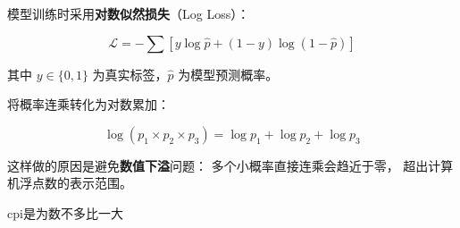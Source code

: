 \begin{note}[对数似然与数值稳定性]

模型训练时采用\textbf{对数似然损失}（Log Loss）：

$$\mathcal{L} = -\sum \left[ y \log \hat{p} 
+ (1-y)\log(1-\hat{p}) \right]$$

其中 $y \in \{0,1\}$ 为真实标签，$\hat{p}$ 为模型预测概率。

将概率连乘转化为对数累加：

$$\log(p_1 \times p_2 \times p_3) 
= \log p_1 + \log p_2 + \log p_3$$

这样做的原因是避免\textbf{数值下溢}问题：
多个小概率直接连乘会趋近于零，
超出计算机浮点数的表示范围。

\end{note}
\begin{dxtips}
    cpi是为数不多比一大
\end{dxtips}